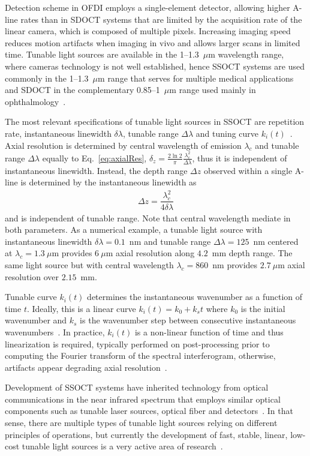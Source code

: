Detection scheme in OFDI employs a single-element detector, allowing higher A-line rates than in SDOCT systems that are limited by the acquisition rate of the linear camera, which is composed of multiple pixels. Increasing imaging speed reduces motion artifacts when imaging in vivo and allows larger scans in limited time. Tunable light sources are available in the 1--1.3~$\mu$m wavelength range, where cameras technology is not well established, hence SSOCT systems are used commonly in the 1--1.3~$\mu$m range that serves for multiple medical applications and SDOCT in the complementary 0.85--1~$\mu$m range used mainly in ophthalmology~\cite{Fujimoto2015_Introduction}.

The most relevant specifications of tunable light sources in SSOCT are repetition rate, instantaneous linewidth $\delta\lambda$, tunable range $\Delta\lambda$ and tuning curve $k_i(t)$~\cite{Yun2015_Wavelength}. Axial resolution is determined by central wavelength of emission $\lambda_c$ and tunable range $\Delta\lambda$ equally to Eq.~\ref{eq:axialRes}, $\delta_z = \frac{2\ln 2}{\pi}\frac{\lambda_c^2}{\Delta\lambda}$, thus it is independent of instantaneous linewidth. Instead, the depth range $\Delta z$ observed within a single A-line is determined by the instantaneous linewidth as
\begin{align}
\Delta z = \dfrac{\lambda_c^2}{4\delta\lambda}
\end{align}
and is independent of tunable range. Note that central wavelength mediate in both parameters. As a numerical example, a tunable light source with instantaneous linewidth $\delta\lambda=0.1$~nm and tunable range $\Delta\lambda=125$~nm centered at $\lambda_c=1.3~\mu$m provides $6~\mu$m axial resolution along $4.2$~mm depth range. The same light source but with central wavelength $\lambda_c=860$~nm provides $2.7~\mu$m axial resolution over $2.15$~mm.

Tunable curve $k_i(t)$ determines the instantaneous wavenumber as a function of time $t$. Ideally, this is a linear curve $k_i(t) = k_0 + k_st$ where $k_0$ is the initial wavenumber and $k_s$ is the wavenumber step between consecutive instantaneous wavenumbers~\cite{Dorrer2000_Spectral}. In practice, $k_i(t)$ is a non-linear function of time and thus linearization is required, typically performed on post-processing prior to computing the Fourier transform of the spectral interferogram, otherwise, artifacts appear degrading axial resolution~\cite{Dorrer2000_Spectral}.

Development of SSOCT systems have inherited technology from optical communications in the near infrared spectrum that employs similar optical components such as tunable laser sources, optical fiber and detectors~\cite{Yariv2007_Photonics}. In that sense, there are multiple types of tunable light sources relying on different principles of operations, but currently the development of fast, stable, linear, low-cost tunable light sources is a very active area of research~\cite{YasinAlibhai2018_Swept}.

